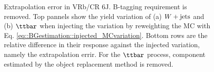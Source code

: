 \begin{figure}[h]
 \caption{Extrapolation error in VRb/CR 6J. B-tagging requirement is removed. Top pannels show the yield variation of (a) $W+\mathrm{jets}$ and (b) $\ttbar$ when injecting the variation by reweighting the MC with Eq. \ref{eq::BGestimation::injected_MCvariation}. Bottom rows are the relative difference in their response against the injected variation, namely the extrapolation errir. For the $\ttbar$ process, component estimated by the object replacement method is removed.  \label{fig::BGestimation::valid_extp_VRb6J} }
\end{figure}


